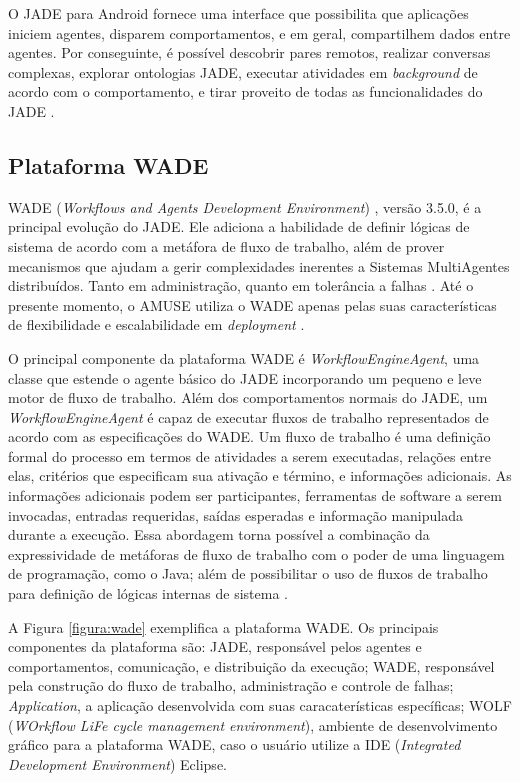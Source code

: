 O JADE para Android fornece uma interface que possibilita que aplicações
iniciem agentes, disparem comportamentos, e em geral, compartilhem dados entre
agentes. Por conseguinte, é possível descobrir pares remotos, realizar
conversas complexas, explorar ontologias JADE, executar atividades em
\textit{background} de acordo com o comportamento, e tirar proveito de todas as
funcionalidades do JADE \cite{bergenti2014}.

    \subsection{Plataforma WADE}
    \label{sec:wadePlatform}

WADE (\textit{Workflows and Agents Development Environment}) \cite{wade},
versão 3.5.0, é a principal evolução do JADE. Ele adiciona a habilidade de
definir lógicas de sistema de acordo com a metáfora de fluxo de trabalho, além
de prover mecanismos que ajudam a gerir complexidades inerentes a Sistemas
MultiAgentes distribuídos. Tanto em administração, quanto em tolerância a
falhas \cite{wade2009}. Até o presente momento, o AMUSE utiliza o WADE apenas
pelas suas características de flexibilidade e escalabilidade em
\textit{deployment} \cite{bergenti2015}.

O principal componente da plataforma WADE é \textit{WorkflowEngineAgent}, uma
classe que estende o agente básico do JADE incorporando um pequeno e leve motor
de fluxo de trabalho. Além dos comportamentos normais do JADE, um
\textit{WorkflowEngineAgent} é capaz de executar fluxos de trabalho
representados de acordo com as especificações do WADE. Um fluxo de trabalho é
uma definição formal do processo em termos de atividades a serem executadas,
relações entre elas, critérios que especificam sua ativação e término, e
informações adicionais. As informações adicionais podem ser participantes,
ferramentas de software a serem invocadas, entradas requeridas, saídas esperadas
e informação manipulada durante a execução. Essa abordagem torna possível a
combinação da expressividade de metáforas de fluxo de trabalho com o poder de
uma linguagem de programação, como o Java; além de possibilitar o uso de fluxos
de trabalho para definição de lógicas internas de sistema \cite{wade}.

A Figura \ref{figura:wade} exemplifica a plataforma WADE. Os principais
componentes da plataforma são: JADE, responsável pelos agentes e comportamentos,
comunicação, e distribuição da execução; WADE, responsável pela construção do
fluxo de trabalho, administração e controle de falhas; \textit{Application}, a
aplicação desenvolvida com suas caracaterísticas específicas; WOLF
(\textit{WOrkflow LiFe cycle management environment}), ambiente de
desenvolvimento gráfico para a plataforma WADE, caso o usuário utilize a IDE
(\textit{Integrated Development Environment}) Eclipse.

